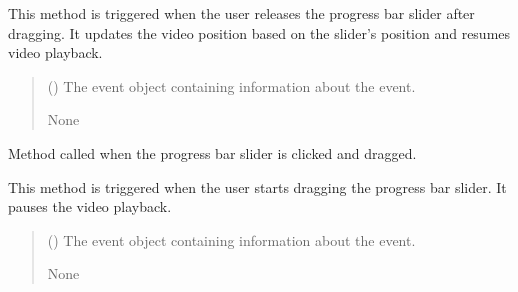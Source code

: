 \documentclass[letterpaper,10pt,english]{sphinxmanual}
\begin{document}
\begin{fulllineitems}
\begin{fulllineitems}
\sphinxAtStartPar
This method is triggered when the user releases the progress bar slider after dragging.
It updates the video position based on the slider’s position and resumes video playback.
\begin{quote}\begin{description}
\sphinxAtStartPar
{} () \textendash{} The event object containing information about the event.

\sphinxAtStartPar
None

\sphinxAtStartPar
{} \textendash{} 

\end{description}\end{quote}

\end{fulllineitems}


\begin{fulllineitems}
\label{\detokenize{general_interface:general_interface.LecteurVideo.on_drag_start}}
\pysigstartsignatures
{}
\pysigstopsignatures
\sphinxAtStartPar
Method called when the progress bar slider is clicked and dragged.

\sphinxAtStartPar
This method is triggered when the user starts dragging the progress bar slider.
It pauses the video playback.
\begin{quote}\begin{description}
\sphinxAtStartPar
{} () \textendash{} The event object containing information about the event.

\sphinxAtStartPar
None

\sphinxAtStartPar
{} \textendash{} 

\end{description}\end{quote}

\end{fulllineitems}


\end{fulllineitems}
\end{document}

